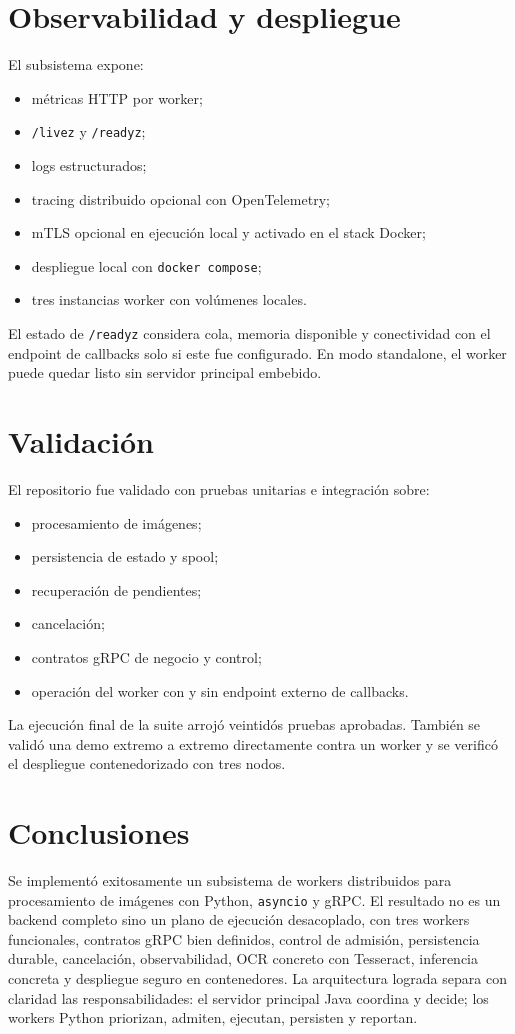 \documentclass[conference]{IEEEtran}
\begin{document}
\section{Observabilidad y despliegue}
El subsistema expone:
\begin{itemize}[leftmargin=*]
\item métricas HTTP por worker;
\item \texttt{/livez} y \texttt{/readyz};
\item logs estructurados;
\item tracing distribuido opcional con OpenTelemetry;
\item mTLS opcional en ejecución local y activado en el stack Docker;
\item despliegue local con \texttt{docker compose};
\item tres instancias worker con volúmenes locales.
\end{itemize}

El estado de \texttt{/readyz} considera cola, memoria disponible y conectividad con el endpoint de callbacks solo si este fue configurado. En modo standalone, el worker puede quedar listo sin servidor principal embebido.

\section{Validación}
El repositorio fue validado con pruebas unitarias e integración sobre:
\begin{itemize}[leftmargin=*]
\item procesamiento de imágenes;
\item persistencia de estado y spool;
\item recuperación de pendientes;
\item cancelación;
\item contratos gRPC de negocio y control;
\item operación del worker con y sin endpoint externo de callbacks.
\end{itemize}

La ejecución final de la suite arrojó veintidós pruebas aprobadas. También se validó una demo extremo a extremo directamente contra un worker y se verificó el despliegue contenedorizado con tres nodos.

\section{Conclusiones}
Se implementó exitosamente un subsistema de workers distribuidos para procesamiento de imágenes con Python, \texttt{asyncio} y gRPC. El resultado no es un backend completo sino un plano de ejecución desacoplado, con tres workers funcionales, contratos gRPC bien definidos, control de admisión, persistencia durable, cancelación, observabilidad, OCR concreto con Tesseract, inferencia concreta y despliegue seguro en contenedores. La arquitectura lograda separa con claridad las responsabilidades: el servidor principal Java coordina y decide; los workers Python priorizan, admiten, ejecutan, persisten y reportan.
\end{document}

